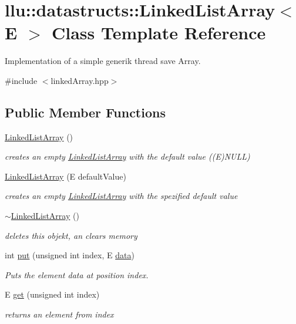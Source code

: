 \hypertarget{classllu_1_1datastructs_1_1_linked_list_array}{\section{llu\+:\+:datastructs\+:\+:Linked\+List\+Array$<$ E $>$ Class Template Reference}
\label{classllu_1_1datastructs_1_1_linked_list_array}
}


Implementation of a simple generik thread save Array.  




{\ttfamily \#include $<$linked\+Array.\+hpp$>$}

\subsection*{Public Member Functions}
\begin{DoxyCompactItemize}
\item 
\hyperlink{classllu_1_1datastructs_1_1_linked_list_array_abc6ac1822c04f74d5df08c500fb404c1}{Linked\+List\+Array} ()
\begin{DoxyCompactList}\small\item\em creates an empty \hyperlink{classllu_1_1datastructs_1_1_linked_list_array}{Linked\+List\+Array} with the default value ((E)N\+U\+L\+L) \end{DoxyCompactList}\item 
\hyperlink{classllu_1_1datastructs_1_1_linked_list_array_aed92b975cd23466ae97c8348a6caaf10}{Linked\+List\+Array} (E default\+Value)
\begin{DoxyCompactList}\small\item\em creates an empty \hyperlink{classllu_1_1datastructs_1_1_linked_list_array}{Linked\+List\+Array} with the spezified default value \end{DoxyCompactList}\item 
\hyperlink{classllu_1_1datastructs_1_1_linked_list_array_a4afa917caa5b398d66cf0853f7f258b9}{$\sim$\+Linked\+List\+Array} ()
\begin{DoxyCompactList}\small\item\em deletes this objekt, an clears memory \end{DoxyCompactList}\item 
int \hyperlink{classllu_1_1datastructs_1_1_linked_list_array_ac588bbfb35a0903ad5c782d11ec0f334}{put} (unsigned int index, E \hyperlink{timux_8hpp_ad9c7575237a3a2780e8e6d16e1334982}{data})
\begin{DoxyCompactList}\small\item\em Puts the element data at position index. \end{DoxyCompactList}\item 
E \hyperlink{classllu_1_1datastructs_1_1_linked_list_array_a9ed83912b4cb5d14512d087ebbb2f8e9}{get} (unsigned int index)
\begin{DoxyCompactList}\small\item\em returns an element from index \end{DoxyCompactList}\end{DoxyCompactItemize}
